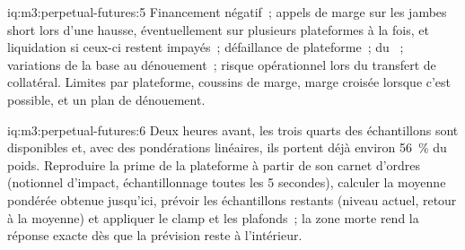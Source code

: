 \begin{solution}{iq:m3:perpetual-futures:5}
Financement négatif~; appels de marge sur les jambes short lors d'une hausse, éventuellement sur plusieurs plateformes à la fois, et liquidation si
ceux-ci restent impayés~; défaillance de plateforme~;  du ~; variations de la base au dénouement~; risque opérationnel lors du transfert de collatéral. Limites par
plateforme, coussins de marge, marge croisée lorsque c'est possible, et un plan de dénouement.
\end{solution}

\begin{solution}{iq:m3:perpetual-futures:6}
Deux heures avant, les trois quarts des échantillons sont disponibles et, avec des pondérations linéaires, ils portent déjà environ 56~\% du
poids. Reproduire la prime de la plateforme à partir de son carnet d'ordres (notionnel d'impact, échantillonnage toutes les 5 secondes), calculer la moyenne pondérée obtenue jusqu'ici,
prévoir les échantillons restants (niveau actuel, retour à la moyenne) et appliquer le clamp et les plafonds~;
la zone morte rend la réponse exacte dès que la prévision reste à l'intérieur.
\end{solution}
